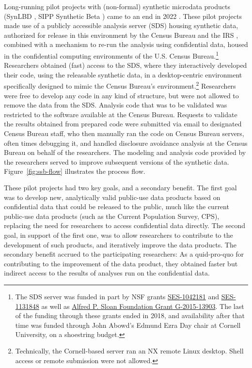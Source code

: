 \documentclass[]{hdsr}
\begin{document}
Long-running pilot projects with (non-formal) synthetic microdata products (SynLBD \citep{KinneyEtAl2011,us_census_bureau_synthetic_2011,vilhuber_codebook_2013}, SIPP Synthetic Beta \citep{Benedettoetal_2013,us_census_bureau_sipp_2015,reeder_codebook_2018}) came to an end in 2022 \citep{vilhuber_end_2022}. These pilot projects made use of a publicly accessible analysis server  (\acf{SDS}) housing synthetic data, authorized for release in this environment by the Census Bureau and the IRS \citep[e.g.][]{us_census_bureau_disclosure_2015}, combined with a mechanism to re-run the analysis using confidential data, housed in the confidential computing environments of the U.S. Census Bureau.\footnote{The \ac{SDS} server was funded in part by NSF grants \href{http://www.nsf.gov/awardsearch/showAward.do?AwardNumber=1042181}{SES-1042181} and \href{http://www.nsf.gov/awardsearch/showAward.do?AwardNumber=1131848}{SES-1131848} as well as \href{https://sloan.org/grant-detail/6845}{Alfred P. Sloan Foundation Grant G-2015-13903}. The last of the funding through these grants ended in 2018, and availability after that time was funded through John Abowd's Edmund Ezra Day chair at Cornell University, on a shoestring budget.} Researchers obtained (fast) access to the \ac{SDS}, where they interactively developed their code, using the releasable synthetic data, in a desktop-centric environment specifically designed to mimic the Census Bureau's environment.\footnote{Technically, the Cornell-based server ran an NX remote Linux desktop. Shell access or remote submission were not allowed.} Researchers were free to develop any code in any kind of structure, but were not allowed to remove the data from the \ac{SDS}. Analysis code that was to be validated was restricted to the software available at the Census Bureau. Requests to validate the results obtained from prepared code were submitted via email to designated Census Bureau staff, who then manually ran the code on Census Bureau servers, often times debugging it, and handled disclosure avoidance analysis at the Census Bureau on behalf of the researchers. The modeling and analysis code provided by the researchers served to improve subsequent versions of the synthetic data. Figure~\ref{fig:ssb-flow} illustrates the process flow.

These pilot projects had two key goals, and a secondary benefit. The first goal was to develop new, analytically valid public-use data products based on confidential data that could be released to the public, much like the current public-use data products (such as the Current Population Survey, CPS), replacing the need for researchers to access confidential data directly. The second goal, in support of the first one, was to allow researchers to contribute to the development of such products, and iteratively improve the data products. The secondary benefit accrued to the participating researchers: As a quid-pro-quo for contributing to the improvement of the data product, they obtained faster but indirect access to the results of analyses run on the confidential data. 
\end{document}
